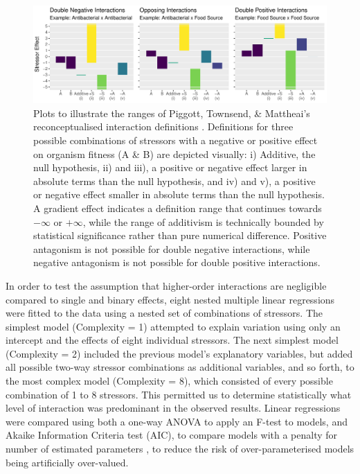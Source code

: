 \documentclass[10pt]{article}
\begin{document}
\begin{figure}[H]
    \centering
    \includegraphics[width = \textwidth]{Scripts/Results/Plot_Interactions_Illustrative.pdf}
    \caption{Plots to illustrate the ranges of Piggott, Townsend, \& Mattheai's reconceptualised interaction definitions \cite{Piggott2015}. Definitions for three possible combinations of stressors with a negative or positive effect on organism fitness (A \& B) are depicted visually: i) Additive, the null hypothesis, ii) and iii), a positive or negative effect larger in absolute terms than the null hypothesis, and iv) and v), a positive or negative effect smaller in absolute terms than the null hypothesis.  A gradient effect indicates a definition range that continues towards $-\infty$ or $+\infty$, while the range of additivism is technically bounded by statistical significance rather than pure numerical difference. Positive antagonism is not possible for double negative interactions, while negative antagonism is not possible for double positive interactions.}
    \label{fig:interaction_ranges}
\end{figure}

In order to test the assumption that higher-order interactions are negligible compared to single and binary effects, eight nested multiple linear regressions were fitted to the data using a nested set of combinations of stressors. The simplest model (Complexity = 1) attempted to explain variation using only an intercept and the effects of eight individual stressors. The next simplest model (Complexity = 2) included the previous model's explanatory variables, but added all possible two-way stressor combinations as additional variables, and so forth, to the most complex model (Complexity = 8), which consisted of every possible combination of 1 to 8 stressors. This permitted us to determine statistically what level of interaction was predominant in the observed results. Linear regressions were compared using both a one-way ANOVA to apply an F-test to models, and Akaike Information Criteria test (AIC), to compare models with a penalty for number of estimated parameters \cite{Akaike1974}, to reduce the risk of over-parameterised models being artificially over-valued. 
\end{document}
